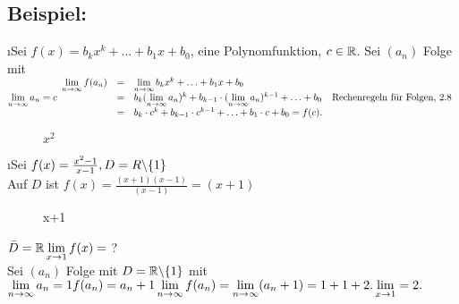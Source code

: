 \subsection[Beispiel]{Beispiel:}
\begin{enumerate}[a)]
\i Sei $f(x) = b_k x^k + \ldots + b_1x + b_0$, eine Polynomfunktion, $ c \in \mathbb{R} $.
Sei $(a_n)$ Folge mit $\lim\limits_{n \rightarrow \infty} a_n = c\\
\begin{array}{rcll}
\lim\limits_{n \rightarrow \infty} f(a_n) &=& \lim\limits_{n \rightarrow \infty} b_k x^k + \ldots + b_1x + b_0 \\
&=& b_k (\lim\limits_{n \rightarrow \infty} a_n)^k + b_{k-1} \cdot (\lim\limits_{n \rightarrow \infty} a_n)^{k-1} + \ldots + b_0 & \text{Rechenregeln f\"ur Folgen, 2.8}\\
&=& b_k \cdot c^k + b_{k-1} \cdot c^{k-1} + \ldots + b_1 \cdot c + b_0 = f(c).
\end{array}$
\begin{figure}[h!]
\centering
{}
\caption{$x^2$}
\end{figure}
\i Sei $f(x) = \frac{x^2-1}{x-1},\\
D = R \backslash \{1\}$\\
Auf $D$ ist $f(x) = \frac{(x+1)(x-1)}{(x-1)} = (x+1) $
\begin{figure}[h!]
\centering
{}
\caption{x+1}
\end{figure}
$\bar{D} = \mathbb{R} \\
\lim\limits_{x \rightarrow 1} f(x) = $ ?\\
Sei $(a_n)$ Folge mit $D = \mathbb{R} \backslash \{ 1\}$ mit $\lim\limits_{n \rightarrow \infty} a_n = 1\\
f(a_n) = a_n + 1\\
\lim\limits_{n \rightarrow \infty} f(a_n) = \lim\limits_{n \rightarrow \infty} (a_n +1) = 1+ 1 +2.
\lim\limits_{x \rightarrow 1} = 2.$\\

\end{enumerate}
